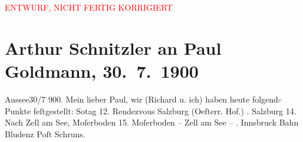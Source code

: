 
\begin{center}
            \textcolor{red}{ENTWURF, NICHT FERTIG KORRIGIERT}
                      \end{center}
            
         
         \renewcommand{\erwaehntePersonen}{Personen: Richard Beer-Hofmann, Paul Goldmann, Alfred Kerr}
         \renewcommand{\erwaehnteOrte}{Orte: Bad Aussee, Berghaus Moserboden, Berlin, Bludenz, Bormio, Hotel und Pension Rudolfshöhe (Leopold Petter), Innsbruck, Iseosee, Italien, Küblis, Pontresina, Salzburg, Schruns, Schweiz, Solda, Sulzfluh, Trafoi, Zell am See, Österreichischer Hof}
         \renewcommand{\erwaehnteWerke}{}
               \section[Arthur Schnitzler an Paul Goldmann, 30. 7. 1900]{ Arthur Schnitzler an Paul Goldmann, 30. 7. 1900}\nopagebreak{}\rehead{ }\begin{ledgroupsized}[t]{13cm}\normalsize\beginnumbering{} \toendnotes[C]{\smallbreak\pagebreak[2]} 
\pstart
           {\pb}Aussee30/7 900.\pend
           \pstart
           Mein lieber Paul, wir (Richard u. ich) haben heute folgend\textcolor{gray}{e} Punkte
               feſtgestellt:\pend
           \pstart
           So{\geminationn}tag 12. Rendezvous Salzburg (Oeſterr. Hof.) \pend
           . Salzburg 14. Nach Zell am See, Moſerboden
               15. Moſerboden – Zell am See – \pend
           . Innsbruck Bahn Bludenz Poſt Schruns.

\end{ledgroupsized}
